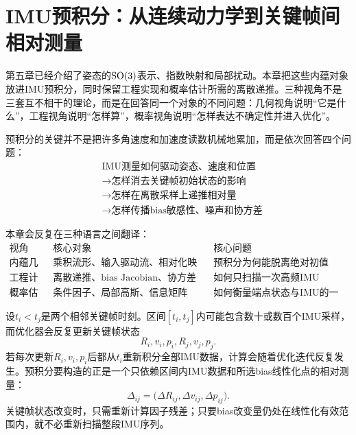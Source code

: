 \chapter{IMU预积分：从连续动力学到关键帧间相对测量}


\newenvironment{imucase}[1]{%
    \par\noindent\textbf{\color{main}例：#1}\rmfamily\par
}{%
    \par\ignorespacesafterend
}

第五章已经介绍了姿态的$\operatorname{SO}(3)$表示、指数映射和局部扰动。本章把这些内蕴对象放进IMU预积分，同时保留工程实现和概率估计所需的离散递推。三种视角不是三套互不相干的理论，而是在回答同一个对象的不同问题：几何视角说明“它是什么”，工程视角说明“怎样算”，概率视角说明“怎样表达不确定性并进入优化”。

预积分的关键并不是把许多角速度和加速度读数机械地累加，而是依次回答四个问题：
\[
\boxed{
\begin{aligned}
&\text{IMU测量如何驱动姿态、速度和位置}\\
&\longrightarrow\text{怎样消去关键帧初始状态的影响}\\
&\longrightarrow\text{怎样在离散采样上递推相对量}\\
&\longrightarrow\text{怎样传播bias敏感性、噪声和协方差}
\end{aligned}
}
\]

本章会反复在三种语言之间翻译：
\[
\begin{array}{c|c|c}
\text{视角} & \text{核心对象} & \text{核心问题}\\ \hline
\text{内蕴几何} & \text{乘积流形、输入驱动流、相对化映射} &
    \text{预积分为何能脱离绝对初值}\\
\text{工程计算} & \text{离散递推、bias Jacobian、协方差传播} &
    \text{如何只扫描一次高频IMU}\\
\text{概率估计} & \text{条件因子、局部高斯、信息矩阵} &
    \text{如何衡量端点状态与IMU的一致性}
\end{array}
\]

设$t_i<t_j$是两个相邻关键帧时刻。区间$[t_i,t_j]$内可能包含数十或数百个IMU采样，而优化器会反复更新关键帧状态
\[
    R_i,v_i,p_i,R_j,v_j,p_j.
\]
若每次更新$R_i,v_i,p_i$后都从$t_i$重新积分全部IMU数据，计算会随着优化迭代反复发生。预积分要构造的正是一个只依赖区间内IMU数据和所选bias线性化点的相对测量：
\[
    \Delta_{ij}
    =\bigl(\Delta R_{ij},\Delta v_{ij},\Delta p_{ij}\bigr).
\]
关键帧状态改变时，只需重新计算因子残差；只要bias改变量仍处在线性化有效范围内，就不必重新扫描整段IMU序列。

